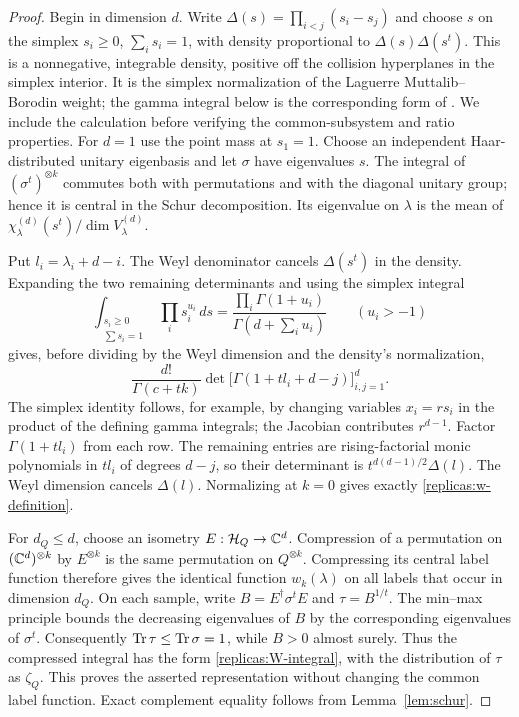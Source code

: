 \begin{proof}
Begin in dimension $d$.  Write $\Delta(s)=\prod_{i<j}(s_i-s_j)$
and choose $s$ on the simplex $s_i\ge0$, $\sum_i s_i=1$, with density
proportional to $\Delta(s)\Delta(s^t)$.  This is a nonnegative,
integrable density, positive off the collision hyperplanes in the
simplex interior.  It is the simplex normalization of the Laguerre
Muttalib--Borodin weight; the gamma integral below is the corresponding
form of \cite[Section~2.3, equation~(26)]{ForresterIpsen2018}.
We include the calculation before verifying the common-subsystem and
ratio properties.  For $d=1$ use the point mass at $s_1=1$.
Choose an independent Haar-distributed unitary eigenbasis and let
$\sigma$ have eigenvalues $s$.  The integral of
$(\sigma^t)^{\otimes k}$ commutes both with permutations and with
the diagonal unitary group; hence it is central in the Schur
decomposition.  Its eigenvalue on $\lambda$ is the mean of
$\chi_\lambda^{(d)}(s^t)/\dim V^{(d)}_\lambda$.

Put $l_i=\lambda_i+d-i$.  The Weyl denominator cancels
$\Delta(s^t)$ in the density.  Expanding the two remaining
determinants and using the simplex integral
\[
 \int_{\substack{s_i\ge0\\\sum s_i=1}}
        \prod_i s_i^{u_i}\,ds
     =\frac{\prod_i\Gamma(1+u_i)}{\Gamma(d+\sum_i u_i)}
                 \qquad(u_i>-1)
\]
gives, before dividing by the Weyl dimension and the density's
normalization,
\[
 \frac{d!}{\Gamma(c+tk)}
       \det\bigl[\Gamma(1+t l_i+d-j)\bigr]_{i,j=1}^d.
\]
The simplex identity follows, for example, by changing variables
$x_i=rs_i$ in the product of the defining gamma integrals; the
Jacobian contributes $r^{d-1}$.  Factor $\Gamma(1+t l_i)$ from
each row.  The remaining entries are rising-factorial monic
polynomials in $t l_i$ of degrees $d-j$, so their determinant is
$t^{d(d-1)/2}\Delta(l)$.  The Weyl dimension cancels $\Delta(l)$.
Normalizing at $k=0$ gives exactly \eqref{replicas:w-definition}.

For $d_Q\le d$, choose an isometry $E:\mathcal H_Q\to\mathbb C^d$.
Compression of a permutation on $(\mathbb C^d)^{\otimes k}$ by
$E^{\otimes k}$ is the same permutation on $Q^{\otimes k}$.
Compressing its central label function therefore gives the identical
function $w_k(\lambda)$ on all labels that occur in dimension $d_Q$.
On each sample, write $B=E^\dagger\sigma^t E$ and
$\tau=B^{1/t}$.  The min--max principle bounds the decreasing
eigenvalues of $B$ by the corresponding eigenvalues of $\sigma^t$.
Consequently $\operatorname{Tr}\tau\le\operatorname{Tr}\sigma=1$, while $B>0$ almost surely.
Thus the compressed integral has the form
\eqref{replicas:W-integral}, with the distribution of $\tau$ as
$\zeta_Q$.  This proves the asserted representation without changing
the common label function.  Exact complement equality follows from
Lemma~\ref{lem:schur}.


\end{proof}

